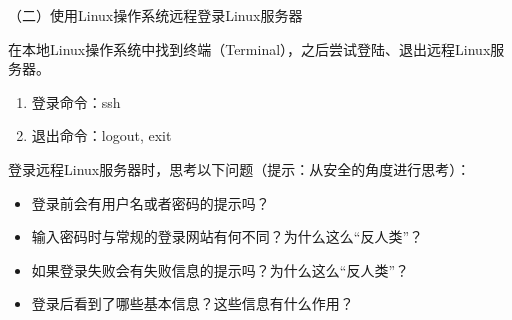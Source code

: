 \vspace{0.1in}
（二）使用Linux操作系统远程登录Linux服务器

在本地Linux操作系统中找到终端（Terminal），之后尝试登陆、退出远程Linux服务器。
\begin{enumerate}
  \item 登录命令：ssh
  \item 退出命令：logout, exit
\end{enumerate}

登录远程Linux服务器时，思考以下问题（提示：从安全的角度进行思考）：
\begin{itemize}
  \item 登录前会有用户名或者密码的提示吗？
  \item 输入密码时与常规的登录网站有何不同？为什么这么“反人类”？
  \item 如果登录失败会有失败信息的提示吗？为什么这么“反人类”？
  \item 登录后看到了哪些基本信息？这些信息有什么作用？
\end{itemize}

